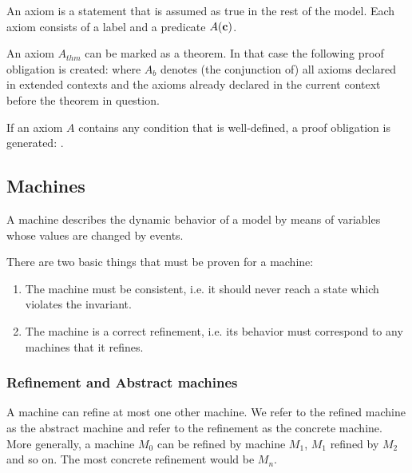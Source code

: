 An axiom is a statement that is assumed as true in the rest of the model.
Each axiom consists of a label and a predicate $A(\mathbf{c})$.

An axiom $A_{thm}$ can be marked as a theorem. In that case the following proof obligation is created:
where $A_b$ denotes (the conjunction of) all axioms declared in extended contexts and the axioms already declared in the current context before the theorem in question.

If an axiom $A$ contains any condition that is well-defined, a proof obligation is generated:
.


\subsection{Machines}
\label{machine}

A machine describes the dynamic behavior of a model by means of variables whose values are changed by events.

There are two basic things that must be proven for a machine:
\begin{enumerate}
	\item The machine must be consistent, i.e. it should never reach a state which violates the invariant.
	\item The machine is a correct refinement, i.e. its behavior must correspond to any machines that it refines.
\end{enumerate}

\subsubsection{Refinement and Abstract machines}
\label{abstract_machine}

A machine can refine at most one other machine. 
We refer to the refined machine as the abstract machine and refer to the refinement as the concrete machine. 
More generally, a machine $M_0$ can be refined by machine $M_1$, $M_1$ refined by $M_2$ 
and so on. The most concrete refinement would be $M_n$. 

